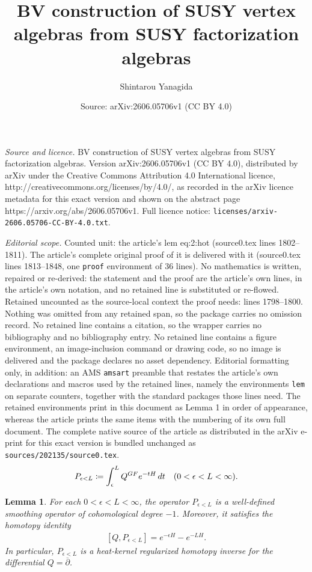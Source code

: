 \documentclass[10pt,a4paper]{amsart}
\title{BV construction of SUSY vertex algebras from SUSY factorization algebras}
\author{Shintarou Yanagida}
\date{Source: arXiv:2606.05706v1 (CC BY 4.0)}
\newtheorem{lem}{Lemma}
\newcommand{\GF}{\textup{GF}}
\newcommand{\bpd}{\overline{\partial}}
\newcommand{\ceq}{\coloneqq} %
\newcommand{\ep}{\epsilon}
\begin{document}
\maketitle

\noindent\emph{Source and licence.} BV construction of SUSY vertex algebras from SUSY factorization algebras. Version arXiv:2606.05706v1 (CC BY 4.0), distributed by arXiv under the Creative Commons Attribution 4.0 International licence, http://creativecommons.org/licenses/by/4.0/, as recorded in the arXiv licence metadata for this exact version and shown on the abstract page https://arxiv.org/abs/2606.05706v1. Full licence notice: \texttt{licenses/arxiv-2606.05706-CC-BY-4.0.txt}.\par\smallskip

\noindent\textit{Editorial scope.} Counted unit: the article's lem eq:2:hot (source0.tex lines 1802--1811). The article's complete original proof of it is delivered with it (source0.tex lines 1813--1848, one \texttt{proof} environment of 36 lines). No mathematics is written, repaired or re-derived: the statement and the proof are the article's own lines, in the article's own notation, and no retained line is substituted or re-flowed.  Retained uncounted as the source-local context the proof needs: lines 1798--1800.  Nothing was omitted from any retained span, so the package carries no omission record.  No retained line contains a citation, so the wrapper carries no bibliography and no bibliography entry.  No retained line contains a figure environment, an image-inclusion command or drawing code, so no image is delivered and the package declares no asset dependency.  Editorial formatting only, in addition: an AMS \texttt{amsart} preamble that restates the article's own declarations and macros used by the retained lines, namely the environments \texttt{lem} on separate counters, together with the standard packages those lines need.  The retained environments print in this document as Lemma 1 in order of appearance, whereas the article prints the same items with the numbering of its own full document.  The complete native source of the article as distributed in the arXiv e-print for this exact version is bundled unchanged as \texttt{sources/202135/source0.tex}.
\begin{align}\label{eq:2:PeL}
 P_{\ep<L} \ceq \int_\ep^L Q^{\GF} e^{-tH}\,dt \quad (0<\ep<L<\infty).
\end{align}

\begin{lem} %
For each $0<\ep<L<\infty$, the operator $P_{\ep<L}$ is 
a well-defined smoothing operator of cohomological degree $-1$. 
Moreover, it satisfies the homotopy identity
\begin{align}\label{eq:2:hot}
 [Q,P_{\ep<L}] = e^{-\ep H}-e^{-LH}.
\end{align}
In particular, $P_{\ep<L}$ is a heat-kernel regularized homotopy inverse 
for the differential $Q=\bpd$.
\end{lem}
\end{document}
